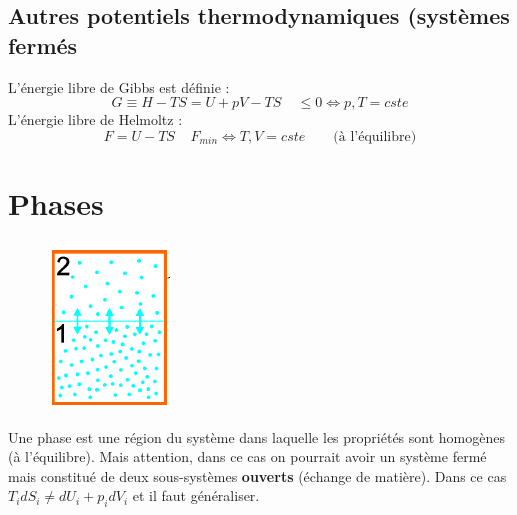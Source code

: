 \documentclass[british,french,11pt, a4paper, openany]{book}
\begin{document}
	
	\subsection{Autres potentiels thermodynamiques (systèmes fermés}
	L'énergie libre de Gibbs est définie : 
	\begin{equation}
	G \equiv H - TS = U + pV - TS\ \ \ \ \ \leq 0 \Leftrightarrow p, T = cste
	\end{equation}
	L'énergie libre de Helmoltz :
	\begin{equation}
	F = U - TS\ \ \ \ \ F_{min} \Leftrightarrow T, V = cste\qquad\text{(à l'équilibre)}
	\end{equation}
	
	\section{Phases}
	\begin{figure}
		\includegraphics[scale=0.4]{cp/image4.png}
	\end{figure}
	Une phase est une région du système dans laquelle les propriétés sont homogènes (à l'équilibre). Mais attention, dans ce cas on pourrait avoir un système fermé mais constitué de deux sous-systèmes \textbf{ouverts } (échange de matière). Dans ce cas $T_idS_i \neq dU_i + p_idV_i$ et il faut généraliser.
	
\end{document}

